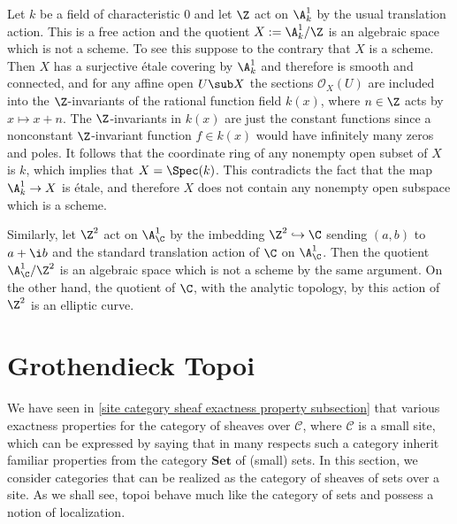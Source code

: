 \begin{example}
Let $k$ be a field of characteristic $0$ and let $\Z$ act on $\A^1_k$ by the usual translation action. This is a free action and the quotient $X:=\A^1_k/\Z$ is an algebraic space which is not a scheme. To see this suppose to the contrary that $X$ is a scheme. Then $X$ has a surjective \'etale covering by $\A^1_k$ and therefore is smooth and connected, and for any affine open $U\sub X$ the sections $\mathscr{O}_X(U)$ are included into the $\Z$-invariants of the rational function field $k(x)$, where $n\in\Z$ acts by $x\mapsto x+n$. The $\Z$-invariants in $k(x)$ are just the constant functions since a nonconstant $\Z$-invariant function $f\in k(x)$ would have infinitely many zeros and poles. It follows that the coordinate ring of any nonempty open subset of $X$ is $k$, which implies that $X=\Spec(k)$. This contradicts the fact that the map $\A^1_k\to X$ is \'etale, and therefore $X$ does not contain any nonempty open subspace which is a scheme.\par
Similarly, let $\Z^2$ act on $\A^1_\C$ by the imbedding $\Z^2\hookrightarrow\C$ sending $(a,b)$ to $a+\i b$ and the standard translation action of $\C$ on $\A^1_{\C}$. Then the quotient $\A^1_{\C}/\Z^2$ is an algebraic space which is not a scheme by the same argument. On the other hand, the quotient of $\C$, with the analytic topology, by this action of $\Z^2$ is an elliptic curve.
\end{example}


\section{Grothendieck Topoi}
We have seen in \autoref{site category sheaf exactness property subsection} that various exactness properties for the category of sheaves over $\mathcal{C}$, where $\mathcal{C}$ is a small site, which can be expressed by saying that in many respects such a category inherit familiar properties from the category $\mathbf{Set}$ of (small) sets. In this section, we consider categories that can be realized as the category of sheaves of sets over a site. As we shall see, topoi behave much like the category of sets and possess a notion of localization.

